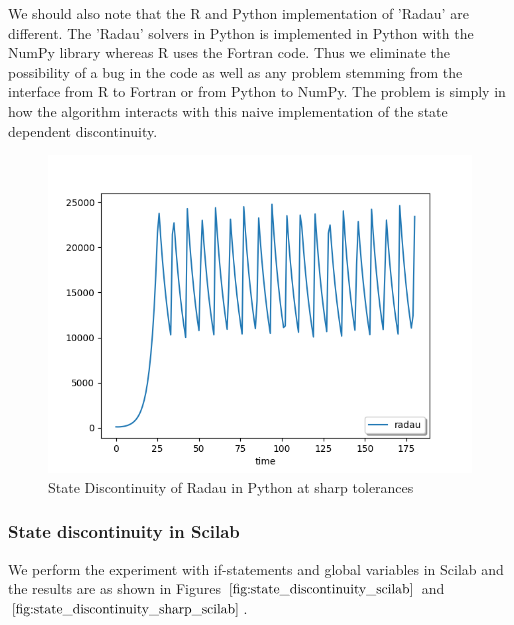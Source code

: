 We should also note that the R and Python implementation of 'Radau' are different. The 'Radau' solvers in Python is implemented in Python with the NumPy library whereas R uses the Fortran code. Thus we eliminate the possibility of a bug in the code as well as any problem stemming from the interface from R to Fortran or from Python to NumPy. The problem is simply in how the algorithm interacts with this naive implementation of the state dependent discontinuity.


\begin{figure}[h]
	\centering
	\includegraphics[width=0.7\linewidth]{./figures/state_discontinuity_sharp_radau_py}
	\caption{State Discontinuity of Radau in Python at sharp tolerances}
	\label{fig:state_discontinuity_sharp_radau_py}
\end{figure}

\subsubsection{State discontinuity in Scilab}
We perform the experiment with if-statements and global variables in Scilab and the results are as shown in Figures $\ref{fig:state_discontinuity_scilab}$ and $\ref{fig:state_discontinuity_sharp_scilab}$.

